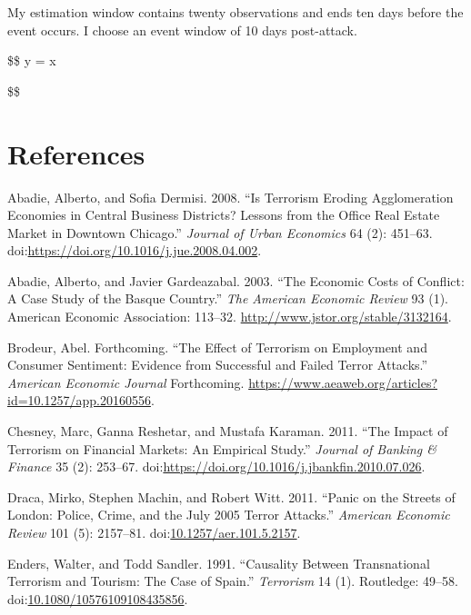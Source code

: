 \documentclass[]{AEA}
\begin{document}
My estimation window contains twenty observations and ends ten days
before the event occurs. I choose an event window of 10 days
post-attack.

\$\$ y = x

\$\$

\section{References}

\appendix

\hypertarget{refs}{}
\hypertarget{ref-ABADIE2008451}{}
Abadie, Alberto, and Sofia Dermisi. 2008. ``Is Terrorism Eroding
Agglomeration Economies in Central Business Districts? Lessons from the
Office Real Estate Market in Downtown Chicago.'' \emph{Journal of Urban
Economics} 64 (2): 451--63.
doi:\href{https://doi.org/https://doi.org/10.1016/j.jue.2008.04.002}{https://doi.org/10.1016/j.jue.2008.04.002}.

\hypertarget{ref-10.2307ux2f3132164}{}
Abadie, Alberto, and Javier Gardeazabal. 2003. ``The Economic Costs of
Conflict: A Case Study of the Basque Country.'' \emph{The American
Economic Review} 93 (1). American Economic Association: 113--32.
\url{http://www.jstor.org/stable/3132164}.

\hypertarget{ref-B_forthcoming}{}
Brodeur, Abel. Forthcoming. ``The Effect of Terrorism on Employment and
Consumer Sentiment: Evidence from Successful and Failed Terror
Attacks.'' \emph{American Economic Journal} Forthcoming.
\url{https://www.aeaweb.org/articles?id=10.1257/app.20160556}.

\hypertarget{ref-CHESNEY2011253}{}
Chesney, Marc, Ganna Reshetar, and Mustafa Karaman. 2011. ``The Impact
of Terrorism on Financial Markets: An Empirical Study.'' \emph{Journal
of Banking \& Finance} 35 (2): 253--67.
doi:\href{https://doi.org/https://doi.org/10.1016/j.jbankfin.2010.07.026}{https://doi.org/10.1016/j.jbankfin.2010.07.026}.

\hypertarget{ref-10.1257ux2faer.101.5.2157}{}
Draca, Mirko, Stephen Machin, and Robert Witt. 2011. ``Panic on the
Streets of London: Police, Crime, and the July 2005 Terror Attacks.''
\emph{American Economic Review} 101 (5): 2157--81.
doi:\href{https://doi.org/10.1257/aer.101.5.2157}{10.1257/aer.101.5.2157}.

\hypertarget{ref-doi:10.1080ux2f10576109108435856}{}
Enders, Walter, and Todd Sandler. 1991. ``Causality Between
Transnational Terrorism and Tourism: The Case of Spain.''
\emph{Terrorism} 14 (1). Routledge: 49--58.
doi:\href{https://doi.org/10.1080/10576109108435856}{10.1080/10576109108435856}.
\end{document}
